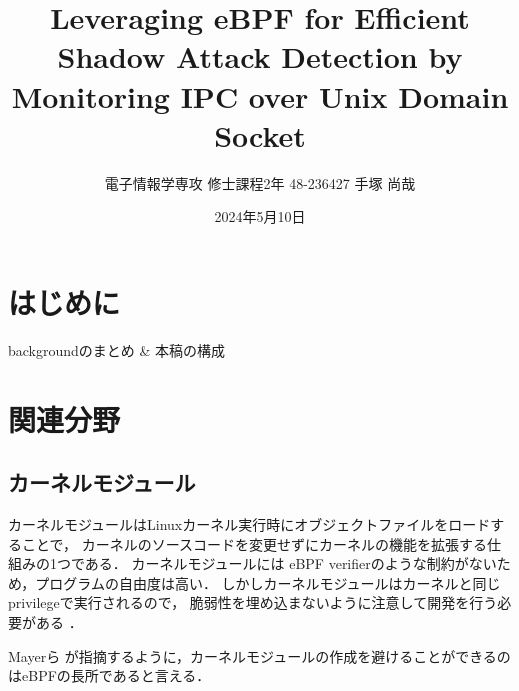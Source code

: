 \documentclass[platex,a4j,10pt,twoside,twocolumn,dvipdfmx]{jsarticle}
\title{Leveraging eBPF for Efficient Shadow Attack Detection by Monitoring IPC over Unix Domain Socket}
\author{電子情報学専攻 修士課程2年 48-236427 手塚 尚哉}
\date{2024年5月10日}
\begin{document}



\section{はじめに}
backgroundのまとめ \& 本稿の構成


    
\section{関連分野}
  \subsection{カーネルモジュール}
  カーネルモジュールはLinuxカーネル実行時にオブジェクトファイルをロードすることで，
  カーネルのソースコードを変更せずにカーネルの機能を拡張する仕組みの1つである．
  カーネルモジュールには eBPF verifierのような制約がないため，プログラムの自由度は高い．
  しかしカーネルモジュールはカーネルと同じprivilegeで実行されるので，
  脆弱性を埋め込まないように注意して開発を行う必要がある \cite{chen2011linux}．

  Mayerら \cite{mayer2021performance}が指摘するように，カーネルモジュールの作成を避けることができるのはeBPFの長所であると言える．
  
\end{document}
